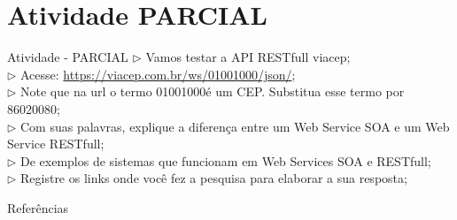 \documentclass{beamer}
\begin{document}
\section{Atividade PARCIAL}
\begin{frame}{Atividade - PARCIAL}
    $\rhd$ Vamos testar a API RESTfull viacep;\\
    \vspace{0.5cm}
    $\rhd$ Acesse: \href{https://viacep.com.br/ws/01001000/json/}{https://viacep.com.br/ws/01001000/json/};\\
    \vspace{0.5cm}
    $\rhd$ Note que na url o termo 01001000é um CEP. Substitua esse termo por 86020080;\\
    \vspace{0.5cm}
    $\rhd$ Com suas palavras, explique a diferença entre um Web Service SOA e um Web Service RESTfull;\\
    \vspace{0.5cm}
    $\rhd$ De exemplos de sistemas que funcionam em Web Services SOA e RESTfull;\\
    \vspace{0.5cm}
    $\rhd$ Registre os links onde você fez a pesquisa para elaborar a sua resposta;
    
\end{frame}

\begin{frame}{Referências}%
 \tiny
 \begin{center}
 	
	 
 \end{center}
 \end{frame}
\end{document}
